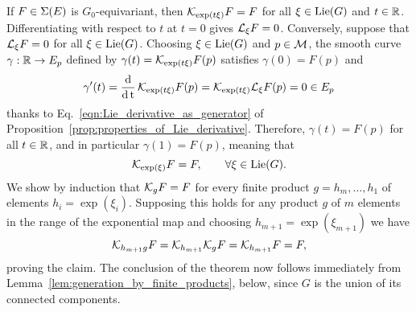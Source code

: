 \documentclass[twoside,11pt]{article}
\begin{document}
    If $F\in\operatorname{\Sigma}(E)$ is $G_0$-equivariant, then ${\mathcal{K}}_{\exp(t\xi)} F = F$ for all $\xi\in\operatorname{Lie}(G)$ and $t\in\mathbb{R}$.
    Differentiating with respect to $t$ at $t=0$ gives ${\mathcal{L}}_{\xi} F = 0$.
    Conversely, suppose that ${\mathcal{L}}_{\xi} F = 0$ for all $\xi\in\operatorname{Lie}(G)$.
    Choosing $\xi\in\operatorname{Lie}(G)$ and $p\in{\mathcal{M}}$, the smooth curve $\gamma:\mathbb{R} \to E_p$ defined by $\gamma(t) = {\mathcal{K}}_{\exp(t\xi)} F(p)$ satisfies $\gamma(0) = F(p)$ and
    \begin{equation}
        \gamma'(t) = \operatorname{\frac{\operatorname{\mathrm{d}}}{\operatorname{\mathrm{d}} t}} {\mathcal{K}}_{\exp(t\xi)} F(p) = {\mathcal{K}}_{\exp(t\xi)} {\mathcal{L}}_{\xi} F(p) = 0 \in E_p
    \end{equation}
    thanks to Eq.~\ref{eqn:Lie_derivative_as_generator} of Proposition~\ref{prop:properties_of_Lie_derivative}.
    Therefore, $\gamma(t) = F(p)$ for all $t\in\mathbb{R}$, and in particular $\gamma(1) = F(p)$, meaning that 
    \begin{equation}
        {\mathcal{K}}_{\exp(\xi)} F = F, \qquad \forall \xi\in\operatorname{Lie}(G).
    \end{equation}
    We show by induction that ${\mathcal{K}}_{g} F = F$ for every finite product $g = h_m, \ldots, h_1$ of elements $h_i = \exp(\xi_i)$.
    Supposing this holds for any product $g$ of $m$ elements in the range of the exponential map and choosing $h_{m+1} = \exp(\xi_{m+1})$ we have
    \begin{equation}
        {\mathcal{K}}_{h_{m+1} g} F = {\mathcal{K}}_{h_{m+1}} {\mathcal{K}}_{g} F = {\mathcal{K}}_{h_{m+1}} F = F,
    \end{equation}
    proving the claim.
    The conclusion of the theorem now follows immediately from Lemma~\ref{lem:generation_by_finite_products}, below, since $G$ is the union of its connected components.
    \hfill\qedsymbol
    
\end{document}
